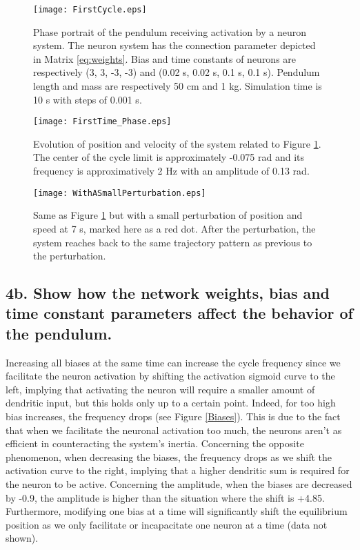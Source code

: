 \documentclass{cmc}
\begin{document}
\begin{figure}[H]
  \centering
  \texttt{[image: FirstCycle.eps]}
  \caption{Phase portrait of the pendulum receiving activation by a neuron system. The neuron system has the connection parameter depicted in Matrix \eqref{eq:weights}. Bias and time constants of neurons are respectively (3, 3, -3, -3) and (0.02 s, 0.02 s, 0.1 s, 0.1 s). Pendulum length and mass are respectively 50 cm and 1 kg. Simulation time is 10 s with steps of 0.001 s.}
  \label{Limit cycle}
\end{figure}
\begin{figure}[H]
  \centering
  \texttt{[image: FirstTime\_Phase.eps]}
   \caption{Evolution of position and velocity of the system related to Figure \ref{Limit cycle}. The center of the cycle limit is approximately -0.075 rad and its frequency is approximatively 2 Hz with an amplitude of 0.13 rad.}
  \label{Time Evolution}
\end{figure}


\begin{figure}[H]
  \centering
  \texttt{[image: WithASmallPerturbation.eps]}
  \caption{Same as Figure \ref{Limit cycle} but with a small perturbation of position and speed at 7 s, marked here as a red dot. After the perturbation, the system reaches back to the same trajectory pattern as previous to the perturbation.}
  \label{Perturbation}
\end{figure}

\subsection*{4b. Show how the network weights, bias and time constant
  parameters affect the behavior of the pendulum.}
\label{sec:4b}

Increasing all biases at the same time can increase the cycle frequency since we facilitate the neuron activation by shifting the activation sigmoid curve to the left, implying that activating the neuron will require a smaller amount of dendritic input, but this holds only up to a certain point. Indeed, for too high bias increases, the frequency drops (see Figure \ref{Biases}). This is due to the fact that when we facilitate the neuronal activation too much, the neurons aren't as efficient in counteracting the system's inertia. Concerning the opposite phenomenon, when decreasing the biases, the frequency drops as we shift the activation curve to the right, implying that a higher dendritic sum is required for the neuron to be active. Concerning the amplitude, when the biases are decreased by -0.9, the amplitude is higher than the situation where the shift is +4.85. Furthermore, modifying one  bias at a time will significantly shift the equilibrium position as we only facilitate or incapacitate one neuron at a time (data not shown). 
\end{document}
